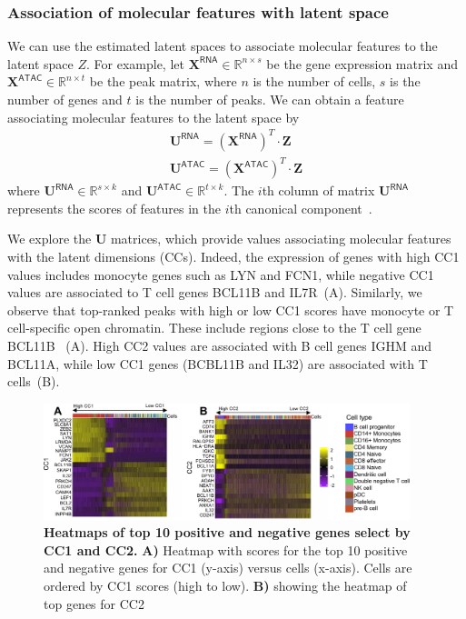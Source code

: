 \subsubsection{Association of molecular features with latent space}
We can use the estimated latent spaces to associate molecular features to the latent space $Z$. For example, let $\textbf{X}^{\mathsf{RNA}}\in \mathbb{R}^{n\times s}$ be the gene expression matrix and $\textbf{X}^{\mathsf{ATAC}}\in \mathbb{R}^{n\times t}$ be the peak matrix, where $n$ is the number of cells,  $s$ is the number of genes and $t$ is the number of peaks. We can obtain a feature associating molecular features to the latent space by
\begin{equation}
    \begin{split}
        \textbf{U}^{\mathsf{RNA}}=(\textbf{X}^{\mathsf{RNA}})^T \cdot \textbf{Z} \\
        \textbf{U}^{\mathsf{ATAC}}=(\textbf{X}^{\mathsf{ATAC}})^T \cdot \textbf{Z}
    \end{split}
\end{equation}
where $\textbf{U}^{\mathsf{RNA}}\in \mathbb{R}^{s\times k}$ and $\textbf{U}^{\mathsf{ATAC}}\in \mathbb{R}^{t \times k}$. The $i$th column of matrix $\textbf{U}^{\mathsf{RNA}}$ represents the scores of features in the $i$th canonical component~.

We explore the $\textbf{U}$ matrices, which provide values associating molecular features with the latent dimensions (CCs). Indeed, the expression of genes with high CC1 values includes monocyte genes such as LYN and FCN1, while negative CC1 values are associated to T cell genes BCL11B and IL7R~(A). Similarly, we observe that top-ranked peaks with high or low CC1 scores have monocyte or T cell-specific open chromatin. These include regions close to the T cell gene BCL11B ~(A). High CC2 values are associated with B cell genes IGHM and BCL11A, while low CC1 genes (BCBL11B and IL32) are associated with T cells~(B).

\begin{figure}[!h]
	\centering
	\includegraphics[width=0.95\textwidth]{CC_Genes/fig}
	\vspace{0.1cm}
	\caption[Heatmaps of top 10 positive and negative genes select by CC1 and CC2.]{\textbf{Heatmaps of top 10 positive and negative genes select by CC1 and CC2.} \textbf{A)} Heatmap with scores for the top 10 positive and negative genes for CC1 (y-axis) versus cells (x-axis). Cells are ordered by CC1 scores (high to low). \textbf{B)} showing the heatmap of top genes for CC2}
	\label{fig:CC_Genes}
\end{figure}

